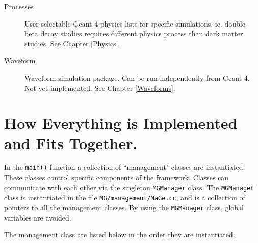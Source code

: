 \begin{description}
\item[{Processes}] 

            User-{}selectable Geant 4 physics lists for specific simulations, ie. 
           double-{}beta decay studies requires different physics process than
           dark matter studies. See Chapter \ref{Physics}.
 


\item[{Waveform}] 

            Waveform simulation package. Can be run independently from Geant 4. 
           Not yet implemented. See Chapter \ref{Waveforms}.
 



\end{description}

\section{How Everything is Implemented and 
Fits Together.}
\label{Structure_Implement}

       In the \nolinkurl{main()} function a collection
      of ``management" classes are instantiated. These classes control specific
      components of the framework. Classes can communicate with each other
      via the singleton \nolinkurl{MGManager} class. The 
 \nolinkurl{MGManager} class is instantiated 
      in the file \nolinkurl{MG/management/MaGe.cc}, and is 
      a collection of pointers to all the management classes.
      By using the \nolinkurl{MGManager} class, global variables are
      avoided.  
 

       The management class are listed below in the order they are instantiated:
 

